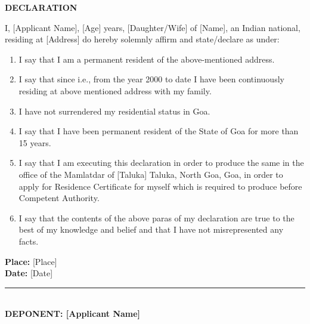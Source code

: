 \documentclass[12pt, a4paper]{article}
\begin{document}
\begin{flushleft}
\end{flushleft}

\begin{center}
    \textbf{\Large DECLARATION}
\end{center}

I, [Applicant Name], [Age] years, [Daughter/Wife] of [Name], an Indian national, residing at [Address] do hereby solemnly affirm and state/declare as under:

\begin{enumerate}
    \item I say that I am a permanent resident of the above-mentioned address.
    \item I say that since i.e., from the year 2000 to date I have been continuously residing at above mentioned address with my family.
    \item I have not surrendered my residential status in Goa.
    \item I say that I have been permanent resident of the State of Goa for more than 15 years.
    \item I say that I am executing this declaration in order to produce the same in the office of the Mamlatdar of [Taluka] Taluka, North Goa, Goa, in order to apply for Residence Certificate for myself which is required to produce before Competent Authority.
    \item I say that the contents of the above paras of my declaration are true to the best of my knowledge and belief and that I have not misrepresented any facts.
\end{enumerate}

\vspace{0.35cm}
\noindent \textbf{Place:} [Place] \\
\textbf{Date:} [Date]

\vspace{0.4cm}
\begin{flushleft}
    \rule{6cm}{0.4pt} \\
    \textbf{DEPONENT: [Applicant Name]}
\end{flushleft}
\end{document}
